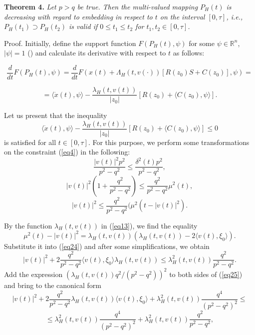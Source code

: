 \documentclass[10 pt]{book}
\begin{document}
\textbf{Theorem 4.} \emph{Let $p>q$ be true. Then the multi-valued mapping $P_{H}(t)$ is decreasing with regard to embedding in respect to $t$ on the interval $[0,\tau]$, i.e., $P_{H}(t_1)\supset P_{H}(t_2)$ is valid if $0\leq t_{1}\leq t_{2}$ for $t_{1}, t_{2}\in[0,\tau]$.}
\medskip

{\sf Proof. } Initially, define the support function $F(P_{H}(t), \psi)$ for some $\psi\in \mathbb{R}^{n}$, $|\psi|=1$ (\cite{26}) and calculate its derivative with respect to $t$ as follows:

$$\frac{d}{dt}F(P_{H}(t),\psi)=\frac{d}{dt}F(x(t)+\Lambda_{H}(t,v(\cdot))[R(z_0)S+C(z_0)],\psi)=$$

$$=\langle\dot{x}(t),\psi\rangle-\frac{\lambda_{H}(t,v(t))}{|z_{0}|}[R(z_0)+\langle C(z_0),\psi\rangle].$$

Let us present that the inequality
\begin{equation} \label{eq23}
\langle\dot{x}(t),\psi\rangle-\frac{\lambda_{H}(t,v(t))}{|z_{0}|}[R(z_0)+\langle C(z_0),\psi\rangle]\leq0
\end{equation}
is satisfied for all $t\in[0, \tau]$. For this purpose, we perform some transformations on the constraint (\ref{eq4}) in the following:
$$\frac{|v(t)|^{2}p^{2}}{p^{2}-q^{2}}\leq\frac{\delta^{2}(t)p^{2}}{p^{2}-q^{2}},$$
$$|v(t)|^{2}\left(1+\frac{q^{2}}{p^{2}-q^{2}}\right)\leq\frac{q^{2}}{p^{2}-q^{2}}\mu^{2}(t),$$
\begin{equation} \label{eq24}
|v(t)|^{2}\leq\frac{q^{2}}{p^{2}-q^{2}}(\mu^{2}(t-|v(t)|^{2}).
\end{equation}

By the function $\lambda_{H} (t, v(t))$ in (\ref{eq13}), we find the equality $$\mu^{2}(t)-|v(t)|^{2}=\lambda_{H}(t,v(t))(\lambda_{H}(t,v(t))-2\langle
v(t),\xi_{0}\rangle).$$ Substitute it into (\ref{eq24}) and after some simplifications, we obtain
\begin{equation} \label{eq25}
|v(t)|^{2}+2\frac{q^{2}}{p^{2}-q^{2}}\langle v(t),\xi_{0}\rangle \lambda_{H}(t,v(t))\leq \lambda_{H}^{2}(t,v(t)) \frac{q^{2}}{p^{2}-q^{2}}.
\end{equation}
Add the expression $\left(\lambda_{H}(t,v(t)) q^{2}/(p^{2}-q^{2})\right)^{2}$ to both sides of (\ref{eq25}) and bring to the canonical form
$$|v(t)|^{2}+2\frac{q^{2} }{p^{2}-q^{2}}\lambda_{H}(t,v(t))\langle v(t),\xi _{0} \rangle +
\lambda_{H}^{2} (t,v(t))\frac{q ^{4} }{(p ^{2} - q ^{2} )^{2} } \leq$$
$$\leq \lambda_{H}^{2} (t,v(t))\frac{q^{4} }{(p^{2} -q^{2})^{2} } +\lambda_{H}^{2} (t,v(t))\frac{q^{2} }{p^{2}-q^{2} },$$
\end{document}
